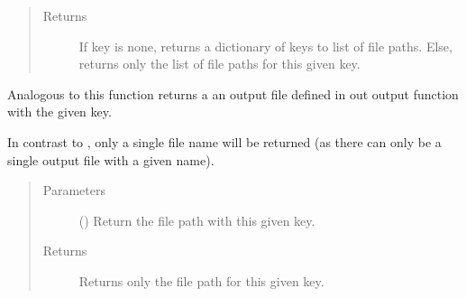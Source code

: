 \documentclass[letterpaper,10pt,english]{sphinxmanual}
\begin{document}
\begin{fulllineitems}
\begin{fulllineitems}
\begin{quote}
\begin{description}
\item[{Returns}] \leavevmode
If key is none, returns a dictionary of keys to list of file paths.
Else, returns only the list of file paths for this given key.

\end{description}\end{quote}

\end{fulllineitems}


\begin{fulllineitems}
\label{\detokenize{documentation/api:b2luigi.Task.get_output_file_name}}
Analogous to {\hyperref[\detokenize{documentation/api:b2luigi.Task.get_input_file_names}]{}} this function returns
a an output file defined in out output function with
the given key.

In contrast to {\hyperref[\detokenize{documentation/api:b2luigi.Task.get_input_file_names}]{}}, only a single file name
will be returned (as there can only be a single output file with a given name).
\begin{quote}\begin{description}
\item[{Parameters}] \leavevmode
{} () \textendash{} Return the file path with this given key.

\item[{Returns}] \leavevmode
Returns only the file path for this given key.

\end{description}\end{quote}

\end{fulllineitems}


\end{fulllineitems}

\end{document}

